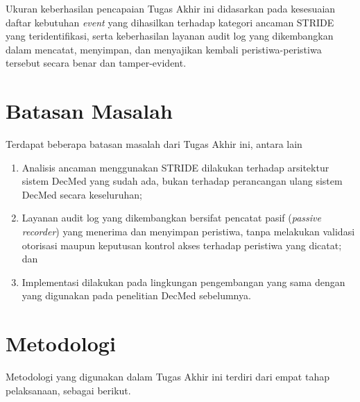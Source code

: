 Ukuran keberhasilan pencapaian Tugas Akhir ini didasarkan pada kesesuaian daftar kebutuhan \textit{event} yang dihasilkan terhadap kategori ancaman STRIDE yang teridentifikasi, serta keberhasilan layanan audit log yang dikembangkan dalam mencatat, menyimpan, dan menyajikan kembali peristiwa-peristiwa tersebut secara benar dan tamper-evident.


\section{Batasan Masalah}
\label{sec:batasan-masalah}

Terdapat beberapa batasan masalah dari Tugas Akhir ini, antara lain

\begin{enumerate}
\item Analisis ancaman menggunakan STRIDE dilakukan terhadap arsitektur sistem DecMed yang sudah ada, bukan terhadap perancangan ulang sistem DecMed secara keseluruhan;
\item Layanan audit log yang dikembangkan bersifat pencatat pasif (\textit{passive recorder}) yang menerima dan menyimpan peristiwa, tanpa melakukan validasi otorisasi maupun keputusan kontrol akses terhadap peristiwa yang dicatat; dan
\item Implementasi dilakukan pada lingkungan pengembangan yang sama dengan yang digunakan pada penelitian DecMed sebelumnya.
\end{enumerate}


\section{Metodologi}
\label{sec:metodologi}

Metodologi yang digunakan dalam Tugas Akhir ini terdiri dari empat tahap pelaksanaan, sebagai berikut.

